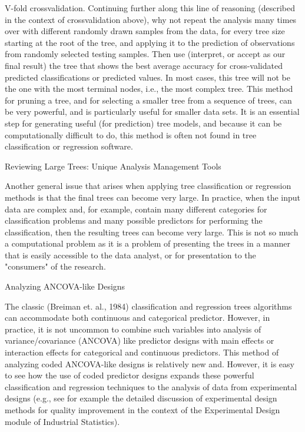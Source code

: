 V-fold crossvalidation. Continuing further along this line of reasoning (described in the context of crossvalidation above), why not repeat the analysis many times over with different randomly drawn samples from the data, for every tree size starting at the root of the tree, and applying it to the prediction of observations from randomly selected testing samples. Then use (interpret, or accept as our final result) the tree that shows the best average accuracy for cross-validated predicted classifications or predicted values. In most cases, this tree will not be the one with the most terminal nodes, i.e., the most complex tree. This method for pruning a tree, and for selecting a smaller tree from a sequence of trees, can be very powerful, and is particularly useful for smaller data sets. It is an essential step for generating useful (for prediction) tree models, and because it can be computationally difficult to do, this method is often not found in tree classification or regression software.

Reviewing Large Trees: Unique Analysis Management Tools

Another general issue that arises when applying tree classification or regression methods is that the final trees can become very large. In practice, when the input data are complex and, for example, contain many different categories for classification problems and many possible predictors for performing the classification, then the resulting trees can become very large. This is not so much a computational problem as it is a problem of presenting the trees in a manner that is easily accessible to the data analyst, or for presentation to the "consumers" of the research.

Analyzing ANCOVA-like Designs

The classic (Breiman et. al., 1984) classification and regression trees algorithms can accommodate both continuous and categorical predictor. However, in practice, it is not uncommon to combine such variables into analysis of variance/covariance (ANCOVA) like predictor designs with main effects or interaction effects for categorical and continuous predictors. This method of analyzing coded ANCOVA-like designs is relatively new and. However, it is easy to see how the use of coded predictor designs expands these powerful classification and regression techniques to the analysis of data from experimental designs (e.g., see for example the detailed discussion of experimental design methods for quality improvement in the context of the Experimental Design module of Industrial Statistics).


